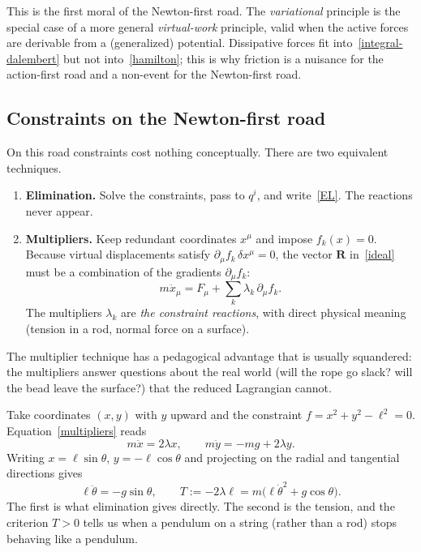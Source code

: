 This is the first moral of the Newton-first road. The \emph{variational}
principle is the special case of a more general \emph{virtual-work}
principle, valid when the active forces are derivable from a (generalized)
potential. Dissipative forces fit into~\eqref{integral-dalembert} but not
into~\eqref{hamilton}; this is why friction is a nuisance for the
action-first road and a non-event for the Newton-first road.

\subsection{Constraints on the Newton-first road}

On this road constraints cost nothing conceptually. There are two equivalent
techniques.

\begin{enumerate}
  \item \textbf{Elimination.} Solve the constraints, pass to $q^i$,
  and write~\eqref{EL}. The reactions never appear.
  \item \textbf{Multipliers.} Keep redundant coordinates $x^\mu$ and impose
  $f_k(x)=0$. Because virtual displacements satisfy
  $\partial_\mu f_k\,\delta x^\mu=0$, the vector $\mathbf R$ in~\eqref{ideal}
  must be a combination of the gradients $\partial_\mu f_k$:
  \begin{equation}
    m\ddot x_\mu=F_\mu+\sum_k\lambda_k\,\partial_\mu f_k .
    \label{multipliers}
  \end{equation}
  The multipliers $\lambda_k$ are \emph{the constraint reactions}, with direct
  physical meaning (tension in a rod, normal force on a surface).
\end{enumerate}

The multiplier technique has a pedagogical advantage that is usually
squandered: the multipliers answer questions about the real world
(will the rope go slack? will the bead leave the surface?) that the reduced
Lagrangian cannot.

\begin{example}\label{pendulum}
Take coordinates $(x,y)$ with $y$ upward and the constraint
$f=x^2+y^2-\ell^2=0$. Equation~\eqref{multipliers} reads
\[
  m\ddot x=2\lambda x,\qquad m\ddot y=-mg+2\lambda y .
\]
Writing $x=\ell\sin\theta$, $y=-\ell\cos\theta$ and projecting on the radial
and tangential directions gives
\[
  \ell\ddot\theta=-g\sin\theta,\qquad
  T:=-2\lambda\ell=m\bigl(\ell\dot\theta^{2}+g\cos\theta\bigr).
\]
The first is what elimination gives directly. The second is the tension, and
the criterion $T>0$ tells us when a pendulum on a string (rather than a rod)
stops behaving like a pendulum.
\end{example}

